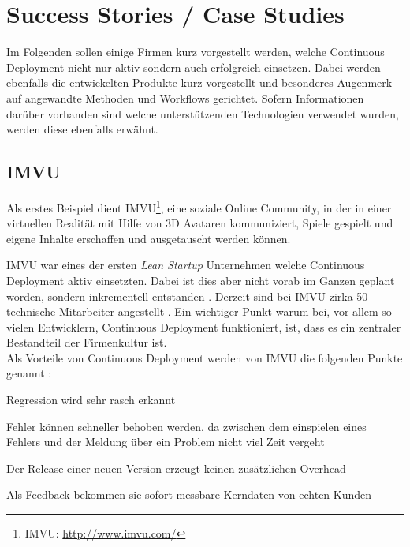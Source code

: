 \section{Success Stories / Case Studies}
\label{sec:success-stories}

Im Folgenden sollen einige Firmen kurz vorgestellt werden, welche Continuous
Deployment nicht nur aktiv sondern auch erfolgreich einsetzen. Dabei werden
ebenfalls die entwickelten Produkte kurz vorgestellt und besonderes Augenmerk
auf angewandte Methoden und Workflows gerichtet. Sofern Informationen darüber
vorhanden sind welche unterstützenden Technologien verwendet wurden, werden
diese ebenfalls erwähnt.


\subsection{IMVU}
\label{subsec:imvu}

Als erstes Beispiel dient IMVU\footnote{IMVU: \url{http://www.imvu.com/}},
eine soziale Online Community, in der in einer virtuellen Realität mit Hilfe
von 3D Avataren kommuniziert, Spiele gespielt und eigene Inhalte erschaffen
und ausgetauscht werden können.

IMVU war eines der ersten \emph{Lean Startup} Unternehmen welche Continuous
Deployment aktiv einsetzten. Dabei ist dies aber nicht vorab im Ganzen geplant
worden, sondern inkrementell entstanden \cite{Fitz2009-02-10}. Derzeit sind
bei IMVU zirka 50 technische Mitarbeiter angestellt \cite{imvu10}. Ein
wichtiger Punkt warum bei, vor allem so vielen Entwicklern, Continuous
Deployment funktioniert, ist, dass es ein zentraler Bestandteil der
Firmenkultur ist. \\
Als Vorteile von Continuous Deployment werden von IMVU die folgenden Punkte
genannt \cite{imvu10}:

\begin{itemize*}
    \item Regression wird sehr rasch erkannt
    \item Fehler können schneller behoben werden, da zwischen dem einspielen
          eines Fehlers und der Meldung über ein Problem nicht viel Zeit vergeht
    \item Der Release einer neuen Version erzeugt keinen zusätzlichen Overhead
    \item Als Feedback bekommen sie sofort messbare Kerndaten von echten Kunden
\end{itemize*}


